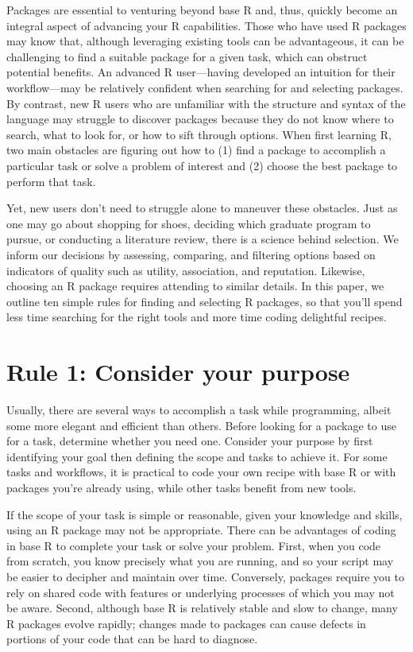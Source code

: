 \documentclass[10pt,letterpaper]{article}
\begin{document}
Packages are essential to venturing beyond base R and, thus, quickly
become an integral aspect of advancing your R capabilities. Those who
have used R packages may know that, although leveraging existing tools
can be advantageous, it can be challenging to find a suitable package
for a given task, which can obstruct potential benefits. An advanced R
user---having developed an intuition for their workflow---may be
relatively confident when searching for and selecting packages. By
contrast, new R users who are unfamiliar with the structure and syntax
of the language may struggle to discover packages because they do not
know where to search, what to look for, or how to sift through options.
When first learning R, two main obstacles are figuring out how to (1)
find a package to accomplish a particular task or solve a problem of
interest and (2) choose the best package to perform that task.

Yet, new users don't need to struggle alone to maneuver these obstacles.
Just as one may go about shopping for shoes, deciding which graduate
program to pursue, or conducting a literature review, there is a science
behind selection. We inform our decisions by assessing, comparing, and
filtering options based on indicators of quality such as utility,
association, and reputation. Likewise, choosing an R package requires
attending to similar details. In this paper, we outline ten simple rules
for finding and selecting R packages, so that you'll spend less time
searching for the right tools and more time coding delightful recipes.

\hypertarget{rule-1-consider-your-purpose}{%
\section{Rule 1: Consider your
purpose}\label{rule-1-consider-your-purpose}}

Usually, there are several ways to accomplish a task while programming,
albeit some more elegant and efficient than others. Before looking for a
package to use for a task, determine whether you need one. Consider your
purpose by first identifying your goal then defining the scope and tasks
to achieve it. For some tasks and workflows, it is practical to code
your own recipe with base R or with packages you're already using, while
other tasks benefit from new tools.

If the scope of your task is simple or reasonable, given your knowledge
and skills, using an R package may not be appropriate. There can be
advantages of coding in base R to complete your task or solve your
problem. First, when you code from scratch, you know precisely what you
are running, and so your script may be easier to decipher and maintain
over time. Conversely, packages require you to rely on shared code with
features or underlying processes of which you may not be aware. Second,
although base R is relatively stable and slow to change, many R packages
evolve rapidly; changes made to packages can cause defects in portions
of your code that can be hard to diagnose.
\end{document}
